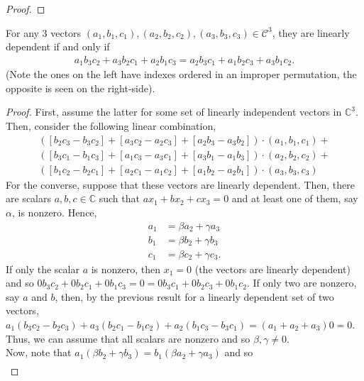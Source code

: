 \documentclass[12pt]{article}
\newenvironment{problem}[2][Problem]{\begin{trivlist} \item[\hskip \labelsep {\bfseries #1}\hskip \labelsep {\bfseries #2.}]}{\end{trivlist}}
\newenvironment{solution}[1][Solution]{\begin{trivlist} \item[\hskip \labelsep {\bfseries #1}]}{\end{trivlist}}
\begin{document}
\begin{problem}{5}
\begin{enumerate}
\begin{solution}
\begin{proof}
\end{proof}
For any $3$ vectors $(a_{1},b_{1},c_{1}),(a_{2},b_{2},c_{2}),(a_{3},b_{3},c_{3})\in \mathcal{C}^{3}$, they are linearly dependent if and only if 
\begin{align*}
  a_{1}b_{3}c_{2} + a_{3}b_{2}c_{1} + a_{2}b_{1}c_{3} = a_{2}b_{3}c_{1} + a_{1}b_{2}c_{3} + a_{3}b_{1}c_{2}.
\end{align*}
(Note the ones on the left have indexes ordered in an improper permutation, the opposite is seen on the right-side).
\begin{proof}
  First, assume the latter for some set of linearly independent vectors in $\mathbb{C}^{3}$. Then, consider the following linear combination, 
\begin{align*}
  \left( \left[ b_{2}c_{3}-b_{3}c_{2} \right] + \left[ a_{3}c_{2}-a_{2}c_{3} \right]+\left[ a_{2}b_{3}-a_{3}b_{2} \right] \right) \cdot (a_{1},b_{1},c_{1})+\\
  \left( \left[ b_{3}c_{1}-b_{1}c_{3} \right] + \left[ a_{1}c_{3}-a_{3}c_{1} \right]+\left[ a_{3}b_{1}-a_{1}b_{3} \right] \right) \cdot (a_{2},b_{2},c_{2})+\\
  \left( \left[ b_{1}c_{2}-b_{2}c_{1} \right] + \left[ a_{2}c_{1}-a_{1}c_{2} \right]+\left[ a_{1}b_{2}-a_{2}b_{1} \right] \right) \cdot (a_{3},b_{3},c_{3})
\end{align*}
For the converse, suppose that these vectors are linearly dependent. Then, there are scalars $a,b,c \in \mathbb{C}$ such that $a x_{1} + b x_{2} + c x_{3} =0$ and at least one of them, say $\alpha$, is nonzero. Hence,
\begin{align*}
  a_{1} &= \beta a_{2} + \gamma a_{3}\\
  b_{1} &= \beta b_{2} + \gamma b_{3}\\
  c_{1} &= \beta c_{2} + \gamma c_{3}.
\end{align*}
If only the scalar $a$ is nonzero, then $x_{1}=0$ (the vectors are linearly dependent) and so $0b_{3}c_{2} + 0b_{2}c_{1} + 0b_{1}c_{3} = 0 = 0b_{3}c_{1} + 0b_{2}c_{3} + 0b_{1}c_{2}$. If only two are nonzero, say $a$ and $b$, then, by the previous result for a linearly dependent set of two vectors, $a_{1}(b_{3}c_{2} - b_{2}c_{3}) + a_{3}(b_{2}c_{1} - b_{1}c_{2}) + a_{2}(b_{1}c_{3} - b_{3}c_{1}) = (a_{1}+a_{2}+a_{3})0 = 0$. Thus, we can assume that all scalars are nonzero and so $\beta,\gamma \neq 0$.\\
Now, note that $a_{1}(\beta b_{2} + \gamma b_{3}) = b_{1} (\beta a_{2} + \gamma a_{3})$ and so 
\begin{align}

\end{align}
\end{proof}
\end{solution}
\end{enumerate}
\end{problem}
\end{document}
